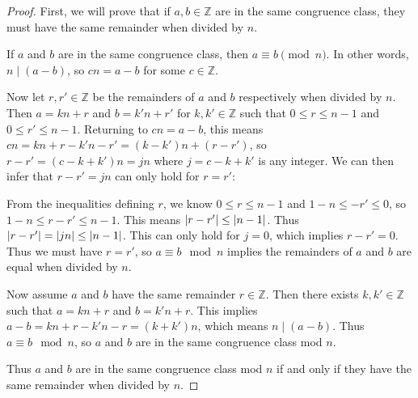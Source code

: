 \documentclass[12pt]{article}
\newcommand{\Z}{\mathbb{Z}}
\theoremstyle{definition}
\begin{document}
\begin{proof}
    First, we will prove that if \(a,b\in\Z\) are in the same congruence class, they must have the same remainder when divided by \(n\).
    
    If \(a\) and \(b\) are in the same congruence class, then \(a\equiv b\pmod{n}\). In other words, \(n\mid (a-b)\), so \(cn = a-b\) for some \(c\in\Z\).
    
    Now let \(r, r'\in\Z\) be the remainders of \(a\) and \(b\) respectively when divided by \(n\). Then \(a = kn + r\) and \(b = k'n + r'\) for \(k, k'\in\Z\) such that \(0\leq r\leq n-1\) and \(0\leq r'\leq n-1\). Returning to \(cn = a-b\), this means \(cn = kn +r - k'n - r' = (k-k')n + (r-r')\), so \(r-r' = (c-k+k')n = jn\) where \(j=c-k+k'\) is any integer. We can then infer that \(r-r' = jn\) can only hold for \(r=r'\):

    From the inequalities defining \(r\), we know \(0\leq r\leq n-1\) and \(1-n\leq -r'\leq 0\), so \(1-n\leq r-r'\leq n-1\). This means \(\abs{r-r'}\leq\abs{n-1}\). Thus \(\abs{r-r'} = \abs{jn}\leq\abs{n-1}\). This can only hold for \(j=0\), which implies \(r-r' = 0\). Thus we must have \(r=r'\), so \(a\equiv b\mod{n}\) implies the remainders of \(a\) and \(b\) are equal when divided by \(n\).

    Now assume \(a\) and \(b\) have the same remainder \(r\in\Z\). Then there exists \(k, k'\in\Z\) such that \(a = kn + r\) and \(b = k'n + r\). This implies \(a-b = kn + r - k'n - r = (k+k')n\), which means \(n\mid (a-b)\). Thus \(a\equiv b\mod{n}\), so \(a\) and \(b\) are in the same congruence class mod \(n\).

    Thus \(a\) and \(b\) are in the same congruence class mod \(n\) if and only if they have the same remainder when divided by \(n\).
\end{proof}
\end{document}

